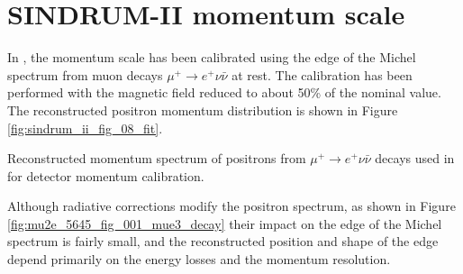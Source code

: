\newpage
\section {SINDRUM-II momentum scale }

In \cite{sindrum_ii:Bertl2006}, the momentum scale has been calibrated using
the edge of the Michel spectrum from muon decays $\mu^+ \rightarrow e^+ \nu \bar{\nu}$
at rest. The calibration has been performed with the magnetic field reduced to about 50\%
of the nominal value. The reconstructed positron momentum distribution is shown
in Figure \ref{fig:sindrum_ii_fig_08_fit}.

\vspace{0.1in}
 {
  \label{fig:sindrum_ii_fig_08_fit}
  Reconstructed momentum spectrum of positrons from $\mu^+ \rightarrow e^+ \nu \bar{\nu}$
  decays used in \cite{sindrum_ii:Bertl2006} for detector momentum calibration.
}
\vspace{0.1in}

Although radiative corrections modify the positron spectrum, as shown in Figure \ref{fig:mu2e_5645_fig_001_mue3_decay} their impact on the edge of the Michel spectrum
is fairly small, and the reconstructed position and shape of the edge depend primarily
on the energy losses and the momentum resolution.

